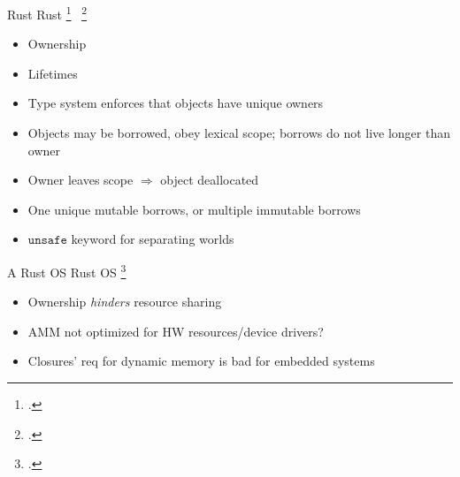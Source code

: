 \documentclass[aspectratio=169]{beamer}
\begin{document}
\begin{frame}{Rust}
    Rust \footcite{matsakis_rust_2014} \ \footcite{jung_rustbelt:_2017}
%
%
    \begin{itemize}
        \item Ownership 
        \item Lifetimes
        \item Type system enforces that objects have unique \alert{owners}
        \item Objects may be borrowed, obey lexical scope; borrows do not live longer than owner 
        \item Owner leaves scope $\Rightarrow$ object \alert{deallocated}
        \item One \alert{unique} mutable borrows, or multiple immutable borrows %
        \item $\texttt{unsafe}$ keyword for separating worlds %
    \end{itemize}
\end{frame}

\begin{frame}{A Rust OS}
Rust OS \footcite{levy_ownership_2015}
    \begin{itemize}
        \item Ownership \emph{hinders} resource sharing
        \item AMM not optimized for HW resources/device drivers?
        \item Closures' req for dynamic memory is bad for embedded systems
    \end{itemize}
\end{frame}
\end{document}
